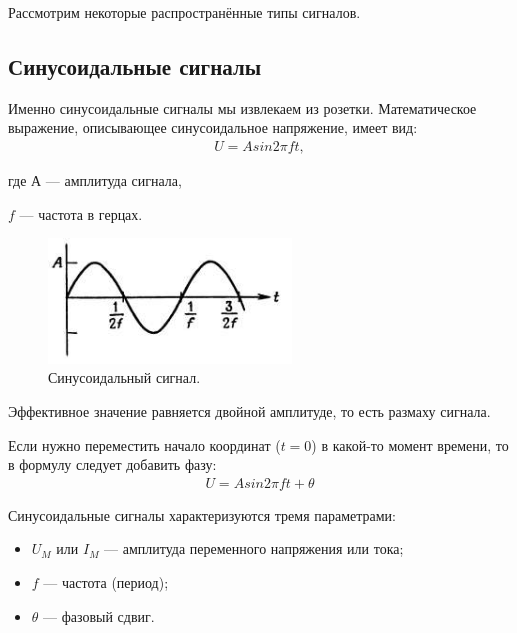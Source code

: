 	Рассмотрим некоторые распространённые типы сигналов.
\subsection{Синусоидальные сигналы}
	Именно синусоидальные сигналы мы извлекаем из розетки. Математическое выражение, описывающее синусоидальное напряжение, имеет вид:
	\begin{gather}
	U=A sin2 \pi ft,
	\end{gather}
	
	где А --- амплитуда сигнала,
	
	$f$ --- частота в герцах.

	\begin{figure}[H]
    \centering
    \includegraphics[width=0.575\textwidth]{../image/s_sin.png}
    \caption{Синусоидальный сигнал.}
	\end{figure}
	Эффективное значение равняется двойной амплитуде, то есть размаху сигнала. 

	Если нужно переместить начало координат ($t=0$) в какой-то момент времени, то в формулу следует добавить фазу:
	\begin{gather}
	U=A sin2 \pi ft + \theta
	\end{gather}
	
	Синусоидальные сигналы характеризуются тремя параметрами:
	\begin{itemize}
		\item $U_{M}$ или $I_{M}$ --- амплитуда переменного напряжения или тока;
		\item $f$ --- частота (период);
		\item $\theta$ --- фазовый сдвиг.
	\end{itemize}

	
	
